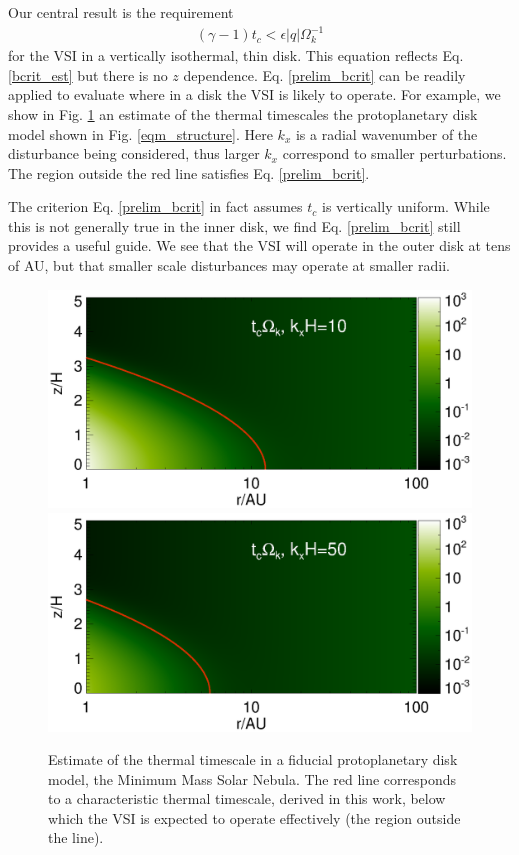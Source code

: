 \documentclass[iop]{emulateapj}
\begin{document}
Our central result is the requirement 
\begin{align}\label{prelim_bcrit}
  (\gamma - 1)t_c < \epsilon |q| \Omega_k^{-1}
\end{align}   
for the VSI in a vertically isothermal, thin disk. This equation
reflects Eq. \ref{bcrit_est} but there is no $z$ dependence. 
Eq. \ref{prelim_bcrit} can be 
readily applied to evaluate where in a disk the VSI is likely to
operate. For example, we show in Fig. \ref{bcrit_mmsn2d} an estimate
of the thermal timescales the protoplanetary disk model shown in
Fig. \ref{eqm_structure}. Here $k_x$ is a radial
wavenumber of the disturbance being considered, thus larger $k_x$
correspond to smaller perturbations. The region outside the red line
satisfies Eq. \ref{prelim_bcrit}. 

The criterion Eq. \ref{prelim_bcrit} in fact
assumes $t_c$ is vertically uniform. While this is not generally true
in the inner disk, we find Eq. \ref{prelim_bcrit} still provides a
useful guide. We see that the VSI will operate in the outer 
disk at tens of AU, but that smaller scale disturbances may operate at
smaller radii. 

\begin{figure}
  \includegraphics[width=\linewidth,clip=true,trim=0cm 1.7cm 0cm
  0.73cm]{figures/bcrit_mmsn2d_kx10}
  \includegraphics[width=\linewidth,clip=true,trim=0cm 0.46cm 0cm
  0.73cm]{figures/bcrit_mmsn2d_kx50}
  \caption{Estimate of the thermal timescale  in a fiducial 
    protoplanetary disk model, the Minimum Mass Solar Nebula. The red
    line corresponds to a characteristic thermal timescale, derived in
    this work, below which the VSI is expected to operate effectively
    (the region outside the line).    
    \label{bcrit_mmsn2d} 
  }
\end{figure}
\end{document}
